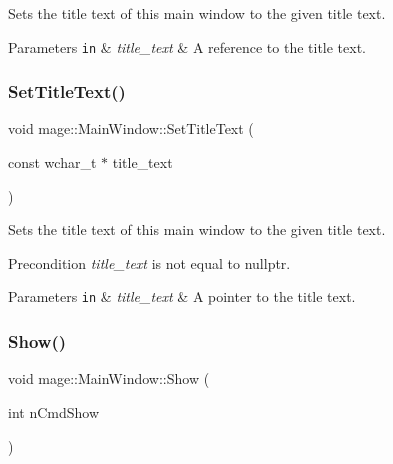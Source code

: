Sets the title text of this main window to the given title text.


\begin{DoxyParams}[1]{Parameters}
\mbox{\tt in}  & {\em title\+\_\+text} & A reference to the title text. \\
\hline
\end{DoxyParams}
\hypertarget{classmage_1_1_main_window_a1baa8554782be197fb5932c3af461f0e}{}\label{classmage_1_1_main_window_a1baa8554782be197fb5932c3af461f0e} 
\subsubsection{\texorpdfstring{Set\+Title\+Text()}{SetTitleText()}\hspace{0.1cm}{\footnotesize\ttfamily [2/2]}}
{\footnotesize\ttfamily void mage\+::\+Main\+Window\+::\+Set\+Title\+Text (\begin{DoxyParamCaption}\item[{const wchar\+\_\+t $\ast$}]{title\+\_\+text }\end{DoxyParamCaption})\hspace{0.3cm}{\ttfamily [noexcept]}}

Sets the title text of this main window to the given title text.

\begin{DoxyPrecond}{Precondition}
{\itshape title\+\_\+text} is not equal to {\ttfamily nullptr}. 
\end{DoxyPrecond}

\begin{DoxyParams}[1]{Parameters}
\mbox{\tt in}  & {\em title\+\_\+text} & A pointer to the title text. \\
\hline
\end{DoxyParams}
\hypertarget{classmage_1_1_main_window_abbb86e7f4dab1b43ca28f83e265f511e}{}\label{classmage_1_1_main_window_abbb86e7f4dab1b43ca28f83e265f511e} 
\subsubsection{\texorpdfstring{Show()}{Show()}}
{\footnotesize\ttfamily void mage\+::\+Main\+Window\+::\+Show (\begin{DoxyParamCaption}\item[{int}]{n\+Cmd\+Show }\end{DoxyParamCaption})\hspace{0.3cm}{\ttfamily [noexcept]}}

